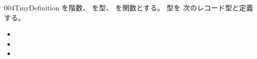 \documentclass[index]{subfiles}
\begin{document}
\begin{myBlock}{004T}{myDefinition}
  を階数、
  を型、
  を関数とする。
  型を
  次のレコード型と定義する。
  \begin{itemize}
  \item {}
  \item {}
  \item {}
  \end{itemize}
\end{myBlock}
\end{document}
